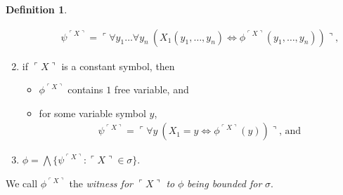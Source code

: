 \documentclass[12pt, twoside]{memoir}
\numberwithin{equation}{section}
\theoremstyle{definition}
\newtheorem{defi}[thm]{Definition}
\theoremstyle{remark}
\theoremstyle{definition}
\theoremstyle{definition}
\theoremstyle{definition}
\theoremstyle{remark}
\begin{document}
\begin{defi}
\begin{enumerate}[label=(\alph*)]
\begin{itemize}[label=$\circ$, leftmargin=20pt]
\begin{align*}
            \psi^{\ulcorner X \urcorner} = \ulcorner \forall y_1 \dots \forall y_n \ (X_1(y_1, \dots, y_n) \iff \phi^{\ulcorner X \urcorner}(y_1, \dots, y_n)) \urcorner \text{,}
        \end{align*}
    \end{itemize}
    \item if $\ulcorner X \urcorner$ is a constant symbol, then 
    \begin{itemize}[label=$\circ$, leftmargin=20pt]
        \item $\phi^{\ulcorner X \urcorner}$ contains $1$ free variable, and
        \item for some variable symbol $y$,
        \begin{align*}
            \psi^{\ulcorner X \urcorner} = \ulcorner \forall y \ (X_1 = y \iff \phi^{\ulcorner X \urcorner}(y)) \urcorner \text{, and}
        \end{align*}
    \end{itemize}
    \item $\phi = \bigwedge \{\psi^{\ulcorner X \urcorner} : \ulcorner X \urcorner \in \sigma\}$.
\end{enumerate}
We call $\phi^{\ulcorner X \urcorner}$ the \emph{witness for} $\ulcorner X \urcorner$ \emph{to} $\phi$ \emph{being bounded for} $\sigma$.
\end{defi}
\end{document}
